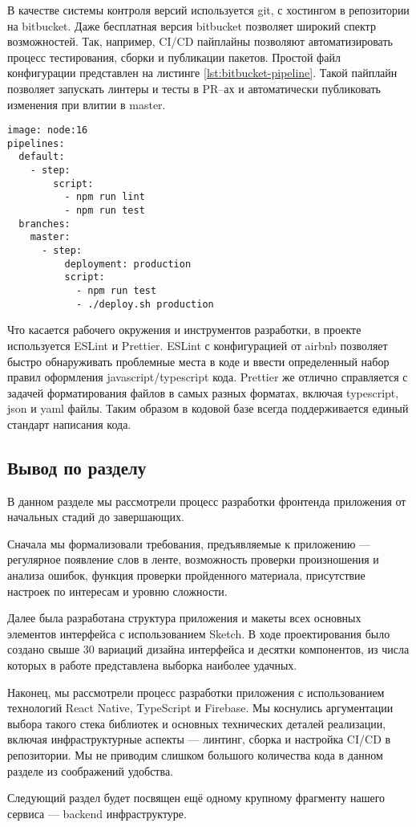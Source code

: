 В качестве системы контроля версий используется git, с хостингом в репозитории на bitbucket. Даже бесплатная версия bitbucket позволяет широкий спектр возможностей. Так, например, CI/CD пайплайны позволяют автоматизировать процесс тестирования, сборки и публикации пакетов. Простой файл конфигурации представлен на листинге \ref{lst:bitbucket-pipeline}. Такой пайплайн позволяет запускать линтеры и тесты в PR--ах и автоматически публиковать изменения при влитии в master.

\begin{lstlisting}[basicstyle=\fontsize{11}{11}\selectfont,tabsize=4,breaklines=true,caption={Пример конфигурации сборочного конвейера bitbucket.},captionpos=b,label={lst:bitbucket-pipeline}]
image: node:16
pipelines:
  default:
    - step:
        script:
          - npm run lint
          - npm run test
  branches:
    master:
      - step:
          deployment: production
          script:
            - npm run test
            - ./deploy.sh production
\end{lstlisting}

Что касается рабочего окружения и инструментов разработки, в проекте используется ESLint и Prettier. ESLint с конфигурацией от airbnb позволяет быстро обнаруживать проблемные места в коде и ввести определенный набор правил оформления javascript/typescript кода. Prettier же отлично справляется с задачей форматирования файлов в самых разных форматах, включая typescript, json и yaml файлы. Таким образом в кодовой базе всегда поддерживается единый стандарт написания кода.

\subsection{Вывод по разделу}
В данном разделе мы рассмотрели процесс разработки фронтенда приложения от начальных стадий до завершающих.

Сначала мы формализовали требования, предъявляемые к приложению --- регулярное появление слов в ленте, возможность проверки произношения и анализа ошибок, функция проверки пройденного материала, присутствие настроек по интересам и уровню сложности.

Далее была разработана структура приложения и макеты всех основных элементов интерфейса с использованием Sketch. В ходе проектирования было создано свыше 30 вариаций дизайна интерфейса и десятки компонентов, из числа которых в работе представлена выборка наиболее удачных.

Наконец, мы рассмотрели процесс разработки приложения с использованием технологий React Native, TypeScript и Firebase. Мы коснулись аргументации выбора такого стека библиотек и основных технических деталей реализации, включая инфраструктурные аспекты --- линтинг, сборка и настройка CI/CD в репозитории. Мы не приводим слишком большого количества кода в данном разделе из соображений удобства.

Следующий раздел будет посвящен ещё одному крупному фрагменту нашего сервиса --- backend инфраструктуре.